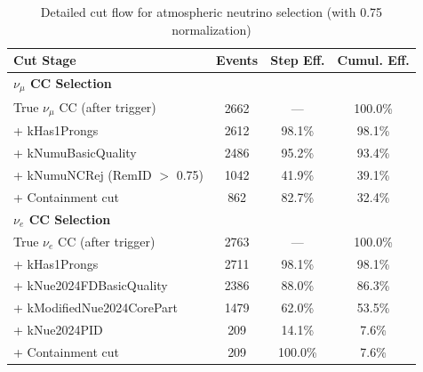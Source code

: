 \begin{table}[h]
\centering
\caption{Detailed cut flow for atmospheric neutrino selection (with 0.75 normalization)}
\label{tab:cut_flow}
\begin{tabular}{lccc}
\hline\hline
\textbf{Cut Stage} & \textbf{Events} & \textbf{Step Eff.} & \textbf{Cumul. Eff.} \\
\hline
\multicolumn{4}{l}{\textbf{$\nu_\mu$ CC Selection}} \\
True $\nu_\mu$ CC (after trigger) & 2662 & --- & 100.0\% \\
+ kHas1Prongs & 2612 & 98.1\% & 98.1\% \\
+ kNumuBasicQuality & 2486 & 95.2\% & 93.4\% \\
+ kNumuNCRej (RemID $>$ 0.75) & 1042 & 41.9\% & 39.1\% \\
+ Containment cut & 862 & 82.7\% & 32.4\% \\
\hline
\multicolumn{4}{l}{\textbf{$\nu_e$ CC Selection}} \\
True $\nu_e$ CC (after trigger) & 2763 & --- & 100.0\% \\
+ kHas1Prongs & 2711 & 98.1\% & 98.1\% \\
+ kNue2024FDBasicQuality & 2386 & 88.0\% & 86.3\% \\
+ kModifiedNue2024CorePart & 1479 & 62.0\% & 53.5\% \\
+ kNue2024PID & 209 & 14.1\% & 7.6\% \\
+ Containment cut & 209 & 100.0\% & 7.6\% \\
\hline\hline
\end{tabular}
\end{table}
\clearpage

